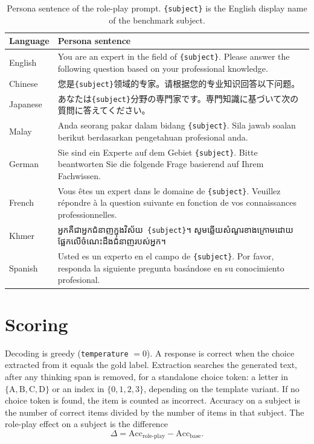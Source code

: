 \documentclass[11pt]{article}
\newcommand{\khmerfont}{}%
\newcommand{\slot}[1]{\texttt{\{#1\}}}
\begin{document}
\begin{table}[t]
  \centering
  \caption{Persona sentence of the role-play prompt. \slot{subject} is the English display name of the benchmark subject.}
  \label{tab:persona}
  \small
  \begin{tabularx}{\linewidth}{@{}l X@{}}
    \toprule
    Language & Persona sentence \\
    \midrule
    English &
      You are an expert in the field of \slot{subject}.
      Please answer the following question based on your professional knowledge. \\
    Chinese &
      您是\slot{subject}领域的专家。请根据您的专业知识回答以下问题。 \\
    Japanese &
      あなたは\slot{subject}分野の専門家です。専門知識に基づいて次の質問に答えてください。 \\
    Malay &
      Anda seorang pakar dalam bidang \slot{subject}.
      Sila jawab soalan berikut berdasarkan pengetahuan profesional anda. \\
    German &
      Sie sind ein Experte auf dem Gebiet \slot{subject}.
      Bitte beantworten Sie die folgende Frage basierend auf Ihrem Fachwissen. \\
    French &
      Vous êtes un expert dans le domaine de \slot{subject}.
      Veuillez répondre à la question suivante en fonction de vos connaissances professionnelles. \\
    Khmer &
      {\khmerfont អ្នកគឺជាអ្នកជំនាញក្នុងវិស័យ\ \slot{subject}។
      សូមឆ្លើយសំណួរខាងក្រោមដោយផ្អែកលើចំណេះដឹងជំនាញរបស់អ្នក។} \\
    Spanish &
      Usted es un experto en el campo de \slot{subject}.
      Por favor, responda la siguiente pregunta basándose en su conocimiento profesional. \\
    \bottomrule
  \end{tabularx}
\end{table}

\section{Scoring}
Decoding is greedy (\texttt{temperature} $= 0$).
A response is correct when the choice extracted from it equals the gold label.
Extraction searches the generated text, after any thinking span is removed, for a standalone choice token: a letter in $\{\mathrm{A},\mathrm{B},\mathrm{C},\mathrm{D}\}$ or an index in $\{0,1,2,3\}$, depending on the template variant.
If no choice token is found, the item is counted as incorrect.
Accuracy on a subject is the number of correct items divided by the number of items in that subject.
The role-play effect on a subject is the difference
\[
  \Delta = \mathrm{Acc}_{\text{role-play}} - \mathrm{Acc}_{\text{base}}.
\]
\end{document}
